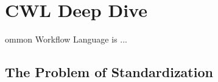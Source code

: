 \chapter{CWL Deep Dive}
\label{cwl-deep-div}


\newpage

ommon Workflow Language is ...





% 
% 
% 

\section{The Problem of Standardization}

